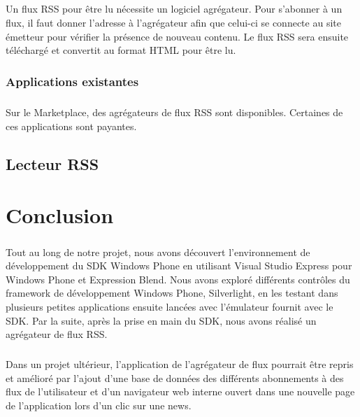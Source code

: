 \documentclass[twoside,UTF8]{EPURapport}
\begin{document}
\paragraph{}
Un flux RSS pour être lu nécessite un logiciel agrégateur. Pour s'abonner à un flux, il faut donner l'adresse à l'agrégateur afin que celui-ci se connecte au site émetteur pour vérifier la présence de nouveau contenu. Le flux RSS sera ensuite téléchargé et convertit au format HTML pour être lu.
		
		\subsection{Applications existantes}
\paragraph{}
Sur le Marketplace, des agrégateurs de flux RSS sont disponibles. Certaines de ces applications sont payantes. 



	\section{Lecteur RSS}

	



\chapter{Conclusion}

\paragraph{}
Tout au long de notre projet, nous avons découvert l'environnement de développement du SDK Windows Phone en utilisant Visual Studio Express pour Windows Phone et Expression Blend. Nous avons exploré différents contrôles du framework de développement Windows Phone, Silverlight, en les testant dans plusieurs petites applications ensuite lancées avec l'émulateur fournit avec le SDK. Par la suite, après la prise en main du SDK, nous avons réalisé un agrégateur de flux RSS. 


\paragraph{}
Dans un projet ultérieur, l'application de l'agrégateur de flux pourrait être repris et amélioré par l'ajout d'une base de données des différents abonnements à des flux de l'utilisateur et d'un navigateur web interne ouvert dans une nouvelle page de l'application lors d'un clic sur une news. 


\nocite{livre}
\nocite{wiki}
\nocite{siteduzero}
\nocite{developpez}
\nocite{microsoft}
\nocite{windowsphone}




\printindex
\end{document}
